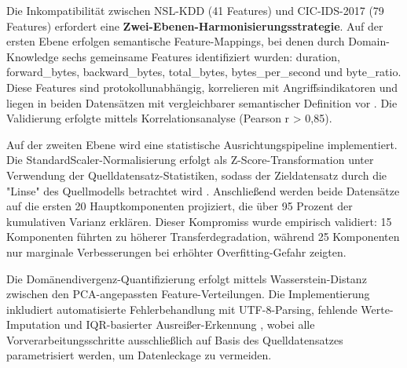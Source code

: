 \documentclass[11pt,a4paper]{article}
\begin{document}

    Die Inkompatibilität zwischen NSL-KDD (41 Features) und CIC-IDS-2017 (79 Features) erfordert eine \textbf{Zwei-Ebenen-Harmonisierungsstrategie}. Auf der ersten Ebene erfolgen semantische Feature-Mappings, bei denen durch Domain-Knowledge sechs gemeinsame Features identifiziert wurden: duration, forward\_bytes, backward\_bytes, total\_bytes, bytes\_per\_second und byte\_ratio. Diese Features sind protokollunabhängig, korrelieren mit Angriffsindikatoren und liegen in beiden Datensätzen mit vergleichbarer semantischer Definition vor \parencite{Gharib2016}. Die Validierung erfolgte mittels Korrelationsanalyse (Pearson r > 0,85).

    Auf der zweiten Ebene wird eine statistische Ausrichtungspipeline implementiert. Die StandardScaler-Normalisierung erfolgt als Z-Score-Transformation unter Verwendung der Quelldatensatz-Statistiken, sodass der Zieldatensatz durch die "Linse" des Quellmodells betrachtet wird \parencite{Goodfellow2016}. Anschließend werden beide Datensätze auf die ersten 20 Hauptkomponenten projiziert, die über 95 Prozent der kumulativen Varianz erklären. Dieser Kompromiss wurde empirisch validiert: 15 Komponenten führten zu höherer Transferdegradation, während 25 Komponenten nur marginale Verbesserungen bei erhöhter Overfitting-Gefahr zeigten.

    Die Domänendivergenz-Quantifizierung erfolgt mittels Wasserstein-Distanz zwischen den PCA-angepassten Feature-Verteilungen. Die Implementierung inkludiert automatisierte Fehlerbehandlung mit UTF-8-Parsing, fehlende Werte-Imputation und IQR-basierter Ausreißer-Erkennung \parencite{Hastie2009}, wobei alle Vorverarbeitungsschritte ausschließlich auf Basis des Quelldatensatzes parametrisiert werden, um Datenleckage zu vermeiden.
\end{document}
